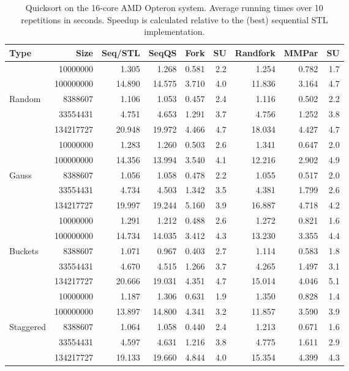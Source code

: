 \documentclass[preprint]{sigplanconf}
\begin{document}
\begin{table*}[t!]
\begin{center}
\begin{tabular}{|lr|rr|rrr||rr|}
\hline
Type & Size & Seq/STL & SeqQS & Fork & SU & Randfork & MMPar & SU \\
\hline
& 10000000 & 1.305 & 1.268 & 0.581 & 2.2 & 1.254 & 0.782 & 1.7 \\
& 100000000 & 14.890 & 14.575 & 3.710 & 4.0 & 11.836 & 3.164 & 4.7 \\
Random & 8388607 & 1.106 & 1.053 & 0.457 & 2.4 & 1.116 & 0.502 & 2.2 \\
& 33554431 & 4.751 & 4.653 & 1.291 & 3.7 & 4.756 & 1.252 & 3.8 \\
& 134217727 & 20.948 & 19.972 & 4.466 & 4.7 & 18.034 & 4.427 & 4.7 \\
\hline
 & 10000000 & 1.283 & 1.260 & 0.503 & 2.6 & 1.341 & 0.647 & 2.0 \\
 & 100000000 & 14.356 & 13.994 & 3.540 & 4.1 & 12.216 & 2.902 & 4.9 \\
Gauss & 8388607 & 1.056 & 1.058 & 0.478 & 2.2 & 1.055 & 0.517 & 2.0 \\
 & 33554431 & 4.734 & 4.503 & 1.342 & 3.5 & 4.381 & 1.799 & 2.6 \\
 & 134217727 & 19.997 & 19.244 & 5.160 & 3.9 & 16.887 & 4.718 & 4.2 \\
\hline
 & 10000000 & 1.291 & 1.212 & 0.488 & 2.6 & 1.272 & 0.821 & 1.6 \\
 & 100000000 & 14.734 & 14.035 & 3.412 & 4.3 & 13.230 & 3.355 & 4.4 \\
Buckets & 8388607 & 1.071 & 0.967 & 0.403 & 2.7 & 1.114 & 0.583 & 1.8 \\
 & 33554431 & 4.670 & 4.515 & 1.266 & 3.7 & 4.265 & 1.497 & 3.1 \\
 & 134217727 & 20.666 & 19.031 & 4.351 & 4.7 & 15.014 & 4.046 & 5.1 \\
\hline
 & 10000000 & 1.187 & 1.306 & 0.631 & 1.9 & 1.350 & 0.828 & 1.4 \\
 & 100000000 & 13.897 & 14.800 & 4.341 & 3.2 & 11.857 & 3.590 & 3.9 \\
Staggered & 8388607 & 1.064 & 1.058 & 0.440 & 2.4 & 1.213 & 0.671 & 1.6 \\
 & 33554431 & 4.597 & 4.631 & 1.216 & 3.8 & 4.775 & 1.611 & 2.9 \\
 & 134217727 & 19.133 & 19.660 & 4.844 & 4.0 & 15.354 & 4.399 & 4.3 \\
\hline
\end{tabular}
\end{center}
\caption{Quicksort on the 16-core AMD Opteron system. 
Average running times over 10 repetitions in seconds.
Speedup is calculated relative to the (best) sequential STL implementation.}
\label{tab:sort_daisy_avg}
\end{table*}
\end{document}
